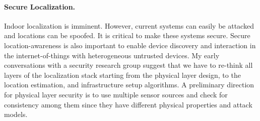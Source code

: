\documentclass[10pt]{article}
\begin{document}
\paragraph{Secure Localization. }
Indoor localization is imminent. However, current systems can easily be attacked and locations can be spoofed. It is critical to make these systems secure. Secure location-awareness is also important to enable device discovery and interaction in the internet-of-things with heterogeneous untrusted devices.
My early conversations with a security research group suggest that we have to re-think all layers of the localization stack starting from the physical layer design, to the location estimation, and infrastructure setup algorithms. %
A preliminary direction for physical layer security is to use multiple sensor sources and check for consistency among them since they have different physical properties and attack models. %

\end{document}
